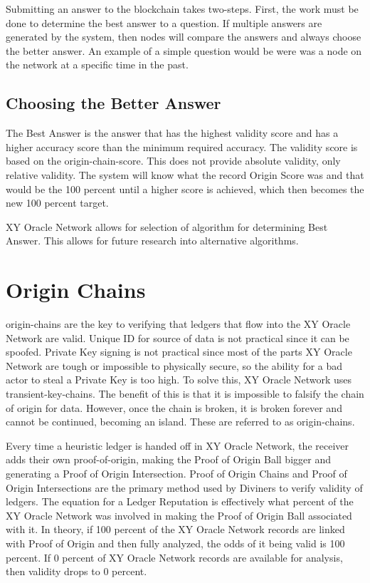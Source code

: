 \documentclass{article}
\begin{document}
Submitting an answer to the blockchain takes two-steps.  First, the work must be done to determine the best answer to a question.  If multiple answers are generated by the system, then nodes will compare the answers and always choose the better answer.
An example of a simple question would be were was a node on the network at a specific time in the past.

\subsection {Choosing the Better Answer}
The Best Answer is the answer that has the highest validity score and has a higher accuracy score than the minimum required accuracy. The validity score is based on the \gls{origin-chain-score}. This does not provide absolute validity, only relative validity.  The system will know what the record Origin Score was and that would be the 100 percent until a higher score is achieved, which then becomes the new 100 percent target.

XY Oracle Network allows for selection of algorithm for determining Best Answer.  This allows for future research into alternative algorithms.

\section {Origin Chains}

\Glspl{origin-chain} are the key to verifying that ledgers that flow into the XY Oracle Network are valid.  Unique ID for source of data is not practical since it can be spoofed. Private Key signing is not practical since most of the parts XY Oracle Network are tough or impossible to physically secure, so the ability for a bad actor to steal a Private Key is too high. To solve this, XY Oracle Network uses \glspl{transient-key-chain}. The benefit of this is that it is impossible to falsify the chain of origin for data. However, once the chain is broken, it is broken forever and cannot be continued, becoming an island.  These are referred to as \glspl{origin-chain}.

Every time a heuristic ledger is handed off in XY Oracle Network, the receiver adds their own \gls{proof-of-origin}, making the Proof of Origin Ball bigger and generating a Proof of Origin Intersection.  Proof of Origin Chains and Proof of Origin Intersections are the primary method used by Diviners to verify validity of ledgers.  The equation for a Ledger Reputation is effectively what percent of the XY Oracle Network was involved in making the Proof of Origin Ball associated with it.  In theory, if 100 percent of the XY Oracle Network records are linked with Proof of Origin and then fully analyzed, the odds of it being valid is 100 percent.  If 0 percent of XY Oracle Network records are available for analysis, then validity drops to 0 percent.
\end{document}
